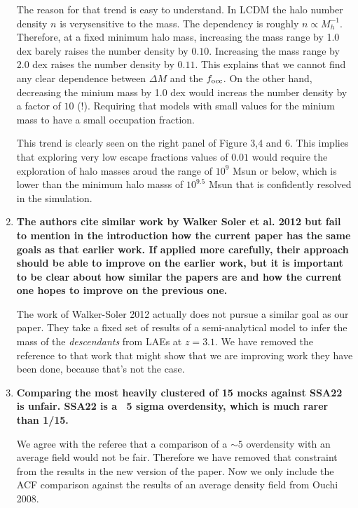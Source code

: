\documentclass[12pts]{article}
\begin{document}
\begin{enumerate}
  The reason for that trend is easy to understand. In LCDM the halo
  number density $n$ is verysensitive to the mass. The dependency is
  roughly $n\propto  M_{h}^{-1}$. Therefore, at a fixed minimum halo
  mass, increasing the mass range by 1.0 dex barely raises the number
  density by  
  $0.10$. Increasing the mass range by 2.0 dex  raises the number
  density by $0.11$. This explains that we cannot find any clear
  dependence between $\Delta M$ and the $f_{\rm occ}$. On the other
  hand, decreasing the minium mass by 1.0 dex would increas the number
  density by a factor of {\bf $10$} (!). Requiring that models with
  small values for the minium mass to have a small occupation
  fraction.  
  
  This trend is clearly seen on the right panel of Figure 3,4 and
  6. This implies that exploring very low escape fractions values of
  $0.01$ would require the exploration of halo masses aroud the range
  of $10^{9}$ Msun or   below, which is lower than the minimum halo
  masss of $10^{9.5}$ Msun   that is confidently resolved in the
  simulation.  

  \item {\bf 
The authors cite similar work by Walker Soler et al. 2012 but fail
   to mention in the introduction how the current paper has the same
   goals as that earlier work.  If applied more carefully, their
   approach should be able to improve on the earlier work, but it is
   important to be clear about how similar the papers are and how the
   current one hopes to improve on the previous one. 
}

The work of Walker-Soler 2012 actually does not pursue a similar goal
as our paper. They take a fixed set of results of a semi-analytical
model to infer the mass of the \emph{descendants} from LAEs at
$z=3.1$. We have removed the reference to that work that might show
that we are improving work they have been done, because that's not the case.

\item {\bf 
Comparing the most heavily clustered of 15 mocks against SSA22 is
  unfair. SSA22 is a ~5 sigma overdensity, which is much rarer than
  1/15. 
  }
  
We agree with the referee that a comparison of a $\sim 5 $ overdensity
with an average field would not be fair. Therefore we have removed
that constraint from the results in the new version of the paper. Now
we only include the ACF comparison against the results of an average
density field from Ouchi 2008. 


\end{enumerate}
\end{document}

